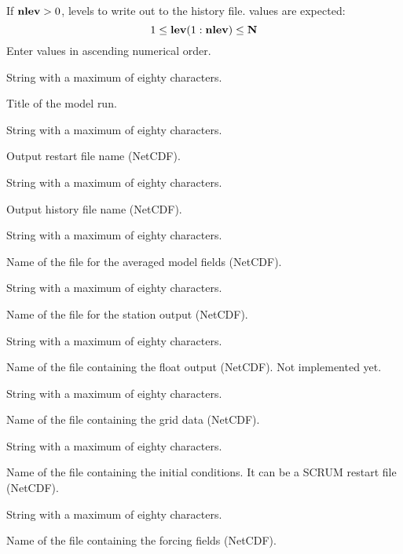 \begin{klist}
\begin{klist}
         If $\mbox{\bf nlev}>0$, levels to write out to the
    history file.   values are expected:
\[
                       1 \leq \mbox{\bf lev}(1:\mbox{\bf nlev}) \leq \mbox{\bf N}
\]
            Enter values in ascending numerical order.
     \end{klist}
     String with a maximum of eighty characters.
     \begin{klist}
           Title of the model run.
     \end{klist}
     String with a maximum of eighty characters.
     \begin{klist}
         Output restart file name (NetCDF).
     \end{klist}
     String with a maximum of eighty characters.
     \begin{klist}
         Output history file name (NetCDF).
     \end{klist}
     String with a maximum of eighty characters.
     \begin{klist}
         Name of the file for the averaged model fields
     (NetCDF).
     \end{klist}
     String with a maximum of eighty characters.
     \begin{klist}
         Name of the file for the station output
    (NetCDF).
     \end{klist}
     String with a maximum of eighty characters.
     \begin{klist}
         Name of the file containing the float output
     (NetCDF). Not implemented yet.
     \end{klist}
     String with a maximum of eighty characters.
     \begin{klist}
         Name of the file containing the grid data
     (NetCDF).
     \end{klist}
     String with a maximum of eighty characters.
     \begin{klist}
         Name of the file containing the initial
     conditions.  It can be a SCRUM restart file (NetCDF).
     \end{klist}
     String with a maximum of eighty characters.
     \begin{klist}
         Name of the file containing the forcing fields
     (NetCDF).

\end{klist}
\end{klist}
